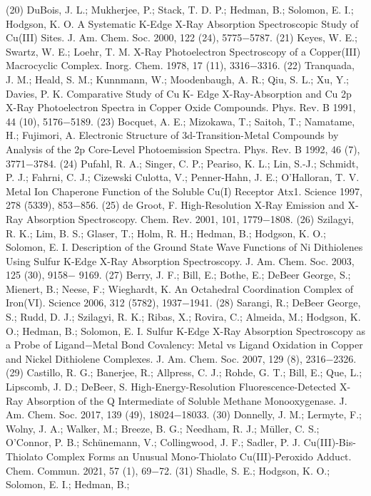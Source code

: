 \documentclass{article}
\begin{document}
(20) DuBois, J. L.; Mukherjee, P.; Stack, T. D. P.; Hedman, B.;
Solomon, E. I.; Hodgson, K. O. A Systematic K-Edge X-Ray
Absorption Spectroscopic Study of Cu(III) Sites. J. Am. Chem. Soc.
2000, 122 (24), 5775−5787.
(21) Keyes, W. E.; Swartz, W. E.; Loehr, T. M. X-Ray Photoelectron
Spectroscopy of a Copper(III) Macrocyclic Complex. Inorg. Chem.
1978, 17 (11), 3316−3316.
(22) Tranquada, J. M.; Heald, S. M.; Kunnmann, W.; Moodenbaugh,
A. R.; Qiu, S. L.; Xu, Y.; Davies, P. K. Comparative Study of Cu K-
Edge X-Ray-Absorption and Cu 2p X-Ray Photoelectron Spectra in
Copper Oxide Compounds. Phys. Rev. B 1991, 44 (10), 5176−5189.
(23) Bocquet, A. E.; Mizokawa, T.; Saitoh, T.; Namatame, H.;
Fujimori, A. Electronic Structure of 3d-Transition-Metal Compounds
by Analysis of the 2p Core-Level Photoemission Spectra. Phys. Rev. B
1992, 46 (7), 3771−3784.
(24) Pufahl, R. A.; Singer, C. P.; Peariso, K. L.; Lin, S.-J.; Schmidt, P.
J.; Fahrni, C. J.; Cizewski Culotta, V.; Penner-Hahn, J. E.; O’Halloran,
T. V. Metal Ion Chaperone Function of the Soluble Cu(I) Receptor
Atx1. Science 1997, 278 (5339), 853−856.
(25) de Groot, F. High-Resolution X-Ray Emission and X-Ray
Absorption Spectroscopy. Chem. Rev. 2001, 101, 1779−1808.
(26) Szilagyi, R. K.; Lim, B. S.; Glaser, T.; Holm, R. H.; Hedman, B.;
Hodgson, K. O.; Solomon, E. I. Description of the Ground State
Wave Functions of Ni Dithiolenes Using Sulfur K-Edge X-Ray
Absorption Spectroscopy. J. Am. Chem. Soc. 2003, 125 (30), 9158−
9169.
(27) Berry, J. F.; Bill, E.; Bothe, E.; DeBeer George, S.; Mienert, B.;
Neese, F.; Wieghardt, K. An Octahedral Coordination Complex of
Iron(VI). Science 2006, 312 (5782), 1937−1941.
(28) Sarangi, R.; DeBeer George, S.; Rudd, D. J.; Szilagyi, R. K.;
Ribas, X.; Rovira, C.; Almeida, M.; Hodgson, K. O.; Hedman, B.;
Solomon, E. I. Sulfur K-Edge X-Ray Absorption Spectroscopy as a
Probe of Ligand−Metal Bond Covalency: Metal vs Ligand Oxidation
in Copper and Nickel Dithiolene Complexes. J. Am. Chem. Soc. 2007,
129 (8), 2316−2326.
(29) Castillo, R. G.; Banerjee, R.; Allpress, C. J.; Rohde, G. T.; Bill,
E.; Que, L.; Lipscomb, J. D.; DeBeer, S. High-Energy-Resolution
Fluorescence-Detected X-Ray Absorption of the Q Intermediate of
Soluble Methane Monooxygenase. J. Am. Chem. Soc. 2017, 139 (49),
18024−18033.
(30) Donnelly, J. M.; Lermyte, F.; Wolny, J. A.; Walker, M.; Breeze,
B. G.; Needham, R. J.; Müller, C. S.; O’Connor, P. B.; Schünemann,
V.; Collingwood, J. F.; Sadler, P. J. Cu(III)-Bis-Thiolato Complex
Forms an Unusual Mono-Thiolato Cu(III)-Peroxido Adduct. Chem.
Commun. 2021, 57 (1), 69−72.
(31) Shadle, S. E.; Hodgson, K. O.; Solomon, E. I.; Hedman, B.;
\end{document}
